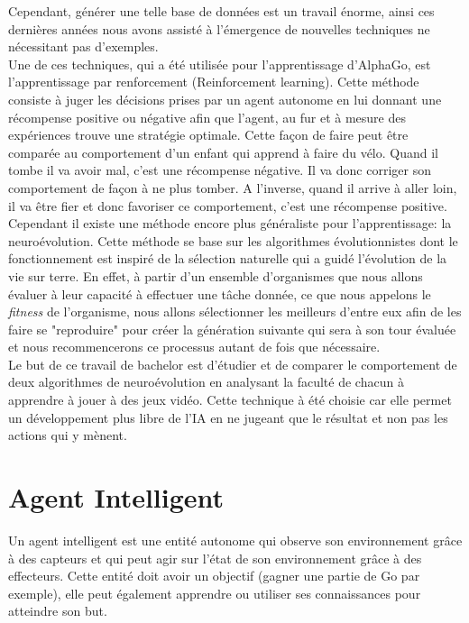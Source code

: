 \documentclass{article}
\begin{document}
Cependant, générer une telle base de données est un travail énorme, ainsi ces dernières années nous avons assisté à l'émergence de nouvelles techniques ne nécessitant pas d'exemples.\\

Une de ces techniques, qui a été utilisée pour l'apprentissage d'AlphaGo\cite{alphago}, est l'apprentissage par renforcement (Reinforcement learning). Cette méthode consiste à juger les décisions prises par un agent autonome en lui donnant une récompense positive ou négative afin que l'agent, au fur et à mesure des expériences trouve une stratégie optimale\cite{wikirl}. Cette façon de faire peut être comparée au comportement d'un enfant qui apprend à faire du vélo. Quand il tombe il va avoir mal, c'est une récompense négative. Il va donc corriger son comportement de façon à ne plus tomber. A l'inverse, quand il arrive à aller loin, il va être fier et donc favoriser ce comportement, c'est une récompense positive.\\

Cependant il existe une méthode encore plus généraliste pour l'apprentissage: la neuroévolution. Cette méthode se base sur les algorithmes évolutionnistes dont le fonctionnement est inspiré de la sélection naturelle qui a guidé l'évolution de la vie sur terre. En effet, à partir d'un ensemble d'organismes que nous allons évaluer à leur capacité à effectuer une tâche donnée, ce que nous appelons le \textit{fitness} de l'organisme, nous allons sélectionner les meilleurs d'entre eux afin de les faire se "reproduire" pour créer la génération suivante qui sera à son tour évaluée et nous recommencerons ce processus autant de fois que nécessaire\cite{wikineuroevolution}.\\

Le but de ce travail de bachelor est d'étudier et de comparer le comportement de deux algorithmes de neuroévolution en analysant la faculté de chacun à apprendre à jouer à des jeux vidéo. Cette technique à été choisie car elle permet un développement plus libre de l'IA en ne jugeant que le résultat et non pas les actions qui y mènent.
\newpage

\section{Agent Intelligent}

Un agent intelligent est une entité autonome qui observe son environnement grâce à des capteurs et qui peut agir sur l'état de son environnement grâce à des effecteurs. Cette entité doit avoir un objectif (gagner une partie de Go par exemple), elle peut également apprendre ou utiliser ses connaissances pour atteindre son but\cite{wikiia}.\\
\end{document}
